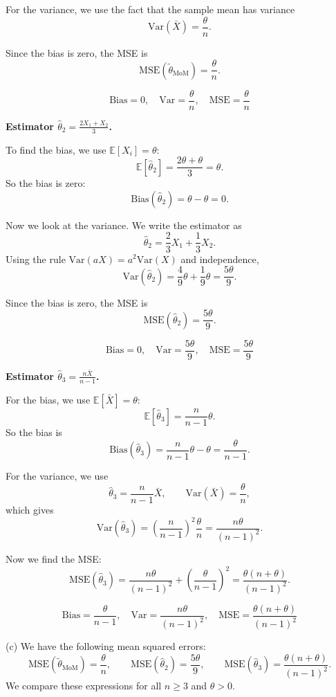 \documentclass[11pt,letterpaper]{article}
\theoremstyle{remark}
\begin{document}
For the variance, we use the fact that the sample mean has variance
\[
\mathrm{Var}(\bar{X}) = \frac{\theta}{n}.
\]

Since the bias is zero, the MSE is
\[
\mathrm{MSE}(\tilde{\theta}_{\text{MoM}}) = \frac{\theta}{n}.
\]

\[
\boxed{\text{Bias} = 0, \quad \text{Var} = \frac{\theta}{n}, \quad \text{MSE} = \frac{\theta}{n}}
\]

\medskip
\noindent
\textbf{Estimator $\hat{\theta}_2 = \frac{2X_1 + X_2}{3}$.}

To find the bias, we use $\mathbb{E}[X_i] = \theta$:
\[
\mathbb{E}[\hat{\theta}_2]
= \frac{2\theta + \theta}{3}
= \theta.
\]
So the bias is zero:
\[
\mathrm{Bias}(\hat{\theta}_2) = \theta - \theta = 0.
\]

Now we look at the variance. We write the estimator as
\[
\hat{\theta}_2 = \frac{2}{3}X_1 + \frac{1}{3}X_2.
\]
Using the rule $\mathrm{Var}(aX) = a^2\mathrm{Var}(X)$ and independence,
\[
\mathrm{Var}(\hat{\theta}_2)
= \frac{4}{9}\theta + \frac{1}{9}\theta
= \frac{5\theta}{9}.
\]

Since the bias is zero, the MSE is
\[
\mathrm{MSE}(\hat{\theta}_2) = \frac{5\theta}{9}.
\]

\[
\boxed{\text{Bias} = 0, \quad \text{Var} = \frac{5\theta}{9}, \quad \text{MSE} = \frac{5\theta}{9}}
\]

\medskip
\noindent
\textbf{Estimator $\hat{\theta}_3 = \frac{n\bar{X}}{n - 1}$.}

For the bias, we use $\mathbb{E}[\bar{X}] = \theta$:
\[
\mathbb{E}[\hat{\theta}_3]
= \frac{n}{n - 1}\theta.
\]
So the bias is
\[
\mathrm{Bias}(\hat{\theta}_3)
= \frac{n}{n - 1}\theta - \theta
= \frac{\theta}{n - 1}.
\]

For the variance, we use
\[
\hat{\theta}_3 = \frac{n}{n - 1}\bar{X},
\qquad
\mathrm{Var}(\bar{X}) = \frac{\theta}{n},
\]
which gives
\[
\mathrm{Var}(\hat{\theta}_3)
= \left(\frac{n}{n - 1}\right)^2 \frac{\theta}{n}
= \frac{n\theta}{(n - 1)^2}.
\]

Now we find the MSE:
\[
\mathrm{MSE}(\hat{\theta}_3)
= \frac{n\theta}{(n - 1)^2}
+ \left(\frac{\theta}{n - 1}\right)^2
= \frac{\theta(n + \theta)}{(n - 1)^2}.
\]

\[
\boxed{\text{Bias} = \frac{\theta}{n-1}, \quad \text{Var} = \frac{n\theta}{(n-1)^2}, \quad \text{MSE} = \frac{\theta(n+\theta)}{(n-1)^2}}
\]

\vspace{1cm}

(c) We have the following mean squared errors:
\[
\text{MSE}(\tilde{\theta}_{\mathrm{MoM}})=\frac{\theta}{n},
\qquad
\text{MSE}(\hat{\theta}_2)=\frac{5\theta}{9},
\qquad
\text{MSE}(\hat{\theta}_3)=\frac{\theta(n+\theta)}{(n-1)^2}.
\]
We compare these expressions for all $n \ge 3$ and $\theta>0$.
\end{document}

